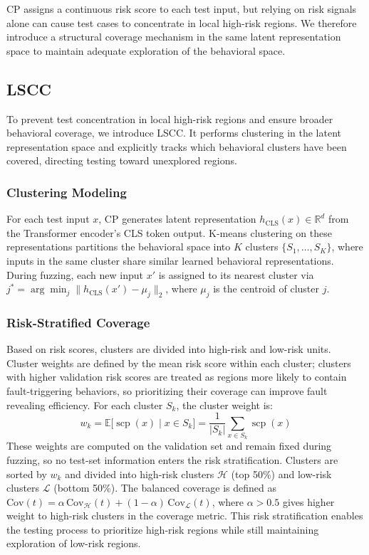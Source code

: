 \documentclass[preprint,number,5p,twocolumn]{elsarticle}
\DeclareMathOperator{\scp}{scp}
\begin{document}
CP assigns a continuous risk score to each test input, but relying on risk signals alone can cause test cases to concentrate in local high-risk regions. We therefore introduce a structural coverage mechanism in the same latent representation space to maintain adequate exploration of the behavioral space.


\subsection{LSCC}\label{sec:coverage}

To prevent test concentration in local high-risk regions and ensure broader behavioral coverage, we introduce LSCC. It performs clustering in the latent representation space and explicitly tracks which behavioral clusters have been covered, directing testing toward unexplored regions.

\subsubsection{Clustering Modeling}

For each test input $x$, CP generates latent representation $h_{\mathrm{CLS}}(x) \in \mathbb{R}^d$ from the Transformer encoder's CLS token output. K-means clustering on these representations partitions the behavioral space into $K$ clusters $\{S_1, \dots, S_K\}$, where inputs in the same cluster share similar learned behavioral representations. During fuzzing, each new input $x'$ is assigned to its nearest cluster via $j^* = \arg\min_j \|h_{\mathrm{CLS}}(x') - \mu_j\|_2$, where $\mu_j$ is the centroid of cluster $j$.

\subsubsection{Risk-Stratified Coverage}

Based on risk scores, clusters are divided into high-risk and low-risk units. Cluster weights are defined by the mean risk score within each cluster; clusters with higher validation risk scores are treated as regions more likely to contain fault-triggering behaviors, so prioritizing their coverage can improve fault revealing efficiency. For each cluster $S_k$, the cluster weight is:
\begin{equation}\label{eq:cluster-weight}
  w_k = \mathbb{E}\bigl[\scp(x) \mid x \in S_k\bigr] = \frac{1}{|S_k|} \sum_{x \in S_k} \scp(x)
\end{equation}
These weights are computed on the validation set and remain fixed during fuzzing, so no test-set information enters the risk stratification. Clusters are sorted by $w_k$ and divided into high-risk clusters $\mathcal{H}$ (top 50\%) and low-risk clusters $\mathcal{L}$ (bottom 50\%). 
The balanced coverage is defined as $\mathrm{Cov}(t) = \alpha \, \mathrm{Cov}_{\mathcal{H}}(t) + (1 - \alpha) \, \mathrm{Cov}_{\mathcal{L}}(t)$, where $\alpha > 0.5$ gives higher weight to high-risk clusters in the coverage metric. This risk stratification enables the testing process to prioritize high-risk regions while still maintaining exploration of low-risk regions.
\end{document}
